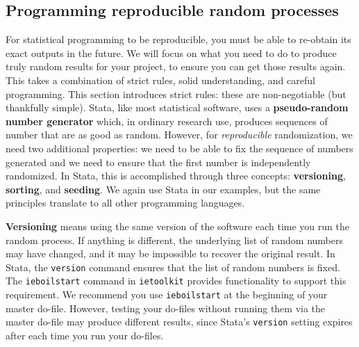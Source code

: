 

\subsection{Programming reproducible random processes}

For statistical programming to be reproducible,
you must be able to re-obtain its exact outputs in the future.
We will focus on what you need to do to produce
truly random results for your project,
to ensure you can get those results again.
This takes a combination of strict rules, solid understanding, and careful programming.
This section introduces strict rules:
these are non-negotiable (but thankfully simple).
Stata, like most statistical software, uses a \textbf{pseudo-random number generator}
which, in ordinary research use,
produces sequences of number that are as good as random.
However, for \textit{reproducible} randomization, we need two additional properties:
we need to be able to fix the sequence of numbers generated and
we need to ensure that the first number is independently randomized.
In Stata, this is accomplished through three concepts:
\textbf{versioning}, \textbf{sorting}, and \textbf{seeding}.
We again use Stata in our examples,
but the same principles translate to all other programming languages.

\textbf{Versioning} means using the same version of the software each time you run the random process.
If anything is different, the underlying list of random numbers may have changed,
and it may be impossible to recover the original result.
In Stata, the \texttt{version} command ensures that the list of random numbers is fixed.
The \texttt{ieboilstart} command in \texttt{ietoolkit} provides functionality to support this requirement.
We recommend you use \texttt{ieboilstart} at the beginning of your master do-file.
However, testing your do-files without running them
via the master do-file may produce different results,
since Stata's \texttt{version} setting expires after each time you run your do-files.

